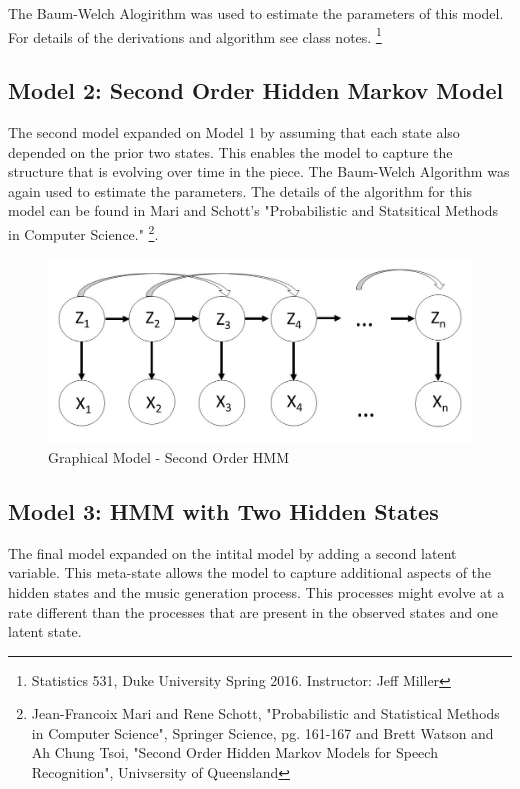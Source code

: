 \documentclass{article} %
\begin{document}
The Baum-Welch Alogirithm was used to estimate the parameters of this model. For details of the derivations and algorithm see class notes. \footnote{Statistics 531, Duke University Spring 2016. Instructor: Jeff Miller}
 
\subsection{Model 2: Second Order Hidden Markov Model}

The second model expanded on Model 1 by assuming that each state also depended on the prior two states. This enables the model to capture the structure that is evolving over time in the piece. The Baum-Welch Algorithm was again used to estimate the parameters. The details of the algorithm for this model can be found in Mari and Schott's "Probabilistic and Statsitical Methods in Computer Science." \footnote{Jean-Francoix Mari and Rene Schott, "Probabilistic and Statistical Methods in Computer Science", Springer Science, pg. 161-167 and Brett Watson and Ah Chung Tsoi, "Second Order Hidden Markov Models for Speech Recognition", Univsersity of Queensland}.

\begin{figure}[H]
\centering
\caption{Graphical Model - Second Order HMM}
\includegraphics [scale = 0.35] {Model2.jpg}
\end{figure}

\subsection{Model 3: HMM with Two Hidden States}

The final model expanded on the intital model by adding a second latent variable. This meta-state allows the model to capture additional aspects of the hidden states and the music generation process.  This processes might evolve at a rate different than the processes that are present in the observed states and one latent state. 
\end{document}
